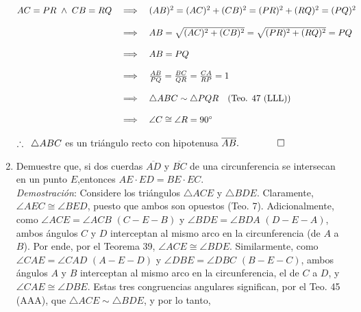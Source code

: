 \documentclass[12pt]{article}
\begin{document}
\begin{enumerate}
\begin{center}
$\begin{array}{@{\hskip 0 in}lll}
AC = PR \hspace{3 pt}\wedge\hspace{3 pt} CB = RQ & \implies & (AB)^2 = (AC)^2 + (CB)^2 = (PR)^2 + (RQ)^2 = (PQ)^2 \\
& \\
								  & \implies & AB = \sqrt{(AC)^2 + (CB)^2} = \sqrt{(PR)^2 + (RQ)^2} = PQ\\
& \\
								  & \implies & AB = PQ \\ 
& \\
								  & \implies & \frac{AB}{PQ} = \frac{BC}{QR} = \frac{CA}{RP} = 1 \\
& \\
								  & \implies &\bigtriangleup ABC \sim \bigtriangleup PQR 
										\quad(\text{Teo. 47 (LLL)})\\
& \\
								  & \implies & \angle C \cong \angle R = 90^{\circ} 
\end{array}$
\end{center}

$\therefore \hspace{5 pt} \bigtriangleup ABC$ es un triángulo recto con hipotenusa $\overline{AB}. \quad\quad\qed$ \\

\pagebreak


\item Demuestre que, si dos cuerdas $\overline{AD}$ y $\overline{BC}$ de una circunferencia se intersecan en un punto $E$,entonces $AE \cdot ED = BE \cdot EC$. \\

{\it Demostración}: Considere los triángulos $\bigtriangleup ACE$ y $\bigtriangleup BDE$. Claramente, $\angle AEC \cong \angle BED$, puesto que ambos son opuestos (Teo. 7). Adicionalmente, como $\angle ACE = \angle ACB$ $(C - E - B)$ y $\angle BDE = \angle BDA$ $(D - E - A)$, ambos ángulos $C$ y $D$ interceptan al mismo arco en la circunferencia (de $A$ a $B$). Por ende, por el Teorema 39, $\angle ACE \cong \angle BDE$. Similarmente, como $\angle CAE = \angle CAD$ $(A - E - D)$ y $\angle DBE = \angle DBC$ $(B - E - C)$, ambos ángulos $A$ y $B$ interceptan al mismo arco en la circunferencia, el de $C$ a $D$, y $\angle CAE \cong \angle DBE$. Estas tres congruencias angulares significan, por el Teo. 45 (AAA), que $\bigtriangleup ACE \sim \bigtriangleup BDE$, y por lo tanto,


\end{enumerate}
\end{document}
